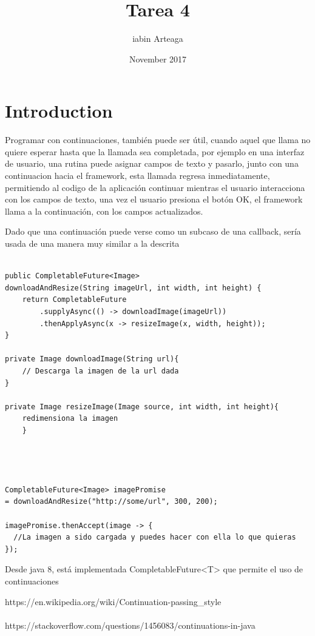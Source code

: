 \documentclass{article}
\title{Tarea 4}
\author{iabin Arteaga}
\date{November 2017}
\begin{document}
\maketitle

\section{Introduction}



Programar con continuaciones, también puede ser útil, cuando aquel que llama no quiere esperar hasta que la llamada sea completada, por ejemplo en una interfaz de usuario, una rutina puede asignar campos de texto y pasarlo, junto con una continuacion hacia el framework, esta llamada regresa inmediatamente, permitiendo al codigo de la aplicación continuar mientras el usuario interacciona con los campos de texto, una vez el usuario presiona el botón OK, el framework llama a la continuación, con los campos actualizados.

Dado que una continuación puede verse como un subcaso de una callback, sería usada de una manera muy similar a la descrita 


\begin{lstlisting}

public CompletableFuture<Image> 
downloadAndResize(String imageUrl, int width, int height) {
    return CompletableFuture
        .supplyAsync(() -> downloadImage(imageUrl))
        .thenApplyAsync(x -> resizeImage(x, width, height));
}

private Image downloadImage(String url){
    // Descarga la imagen de la url dada
}

private Image resizeImage(Image source, int width, int height){
    redimensiona la imagen
    }




CompletableFuture<Image> imagePromise 
= downloadAndResize("http://some/url", 300, 200);

imagePromise.thenAccept(image -> {
  //La imagen a sido cargada y puedes hacer con ella lo que quieras
});
\end{lstlisting}



Desde java 8, está implementada CompletableFuture<T> que permite el uso de continuaciones







https://en.wikipedia.org/wiki/Continuation-passing_style\\ \\
https://stackoverflow.com/questions/1456083/continuations-in-java
\end{document}
